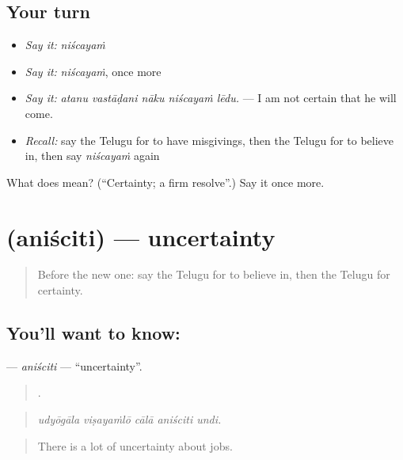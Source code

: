\subsection*{Your turn}
\begin{itemize}
\raggedright
  \item \emph{Say it:} \emph{niścayaṁ}
  \item \emph{Say it:} \emph{niścayaṁ}, once more
  \item \emph{Say it:} \emph{atanu vastāḍani nāku niścayaṁ lēdu.} — I am not certain that he will come.
  \item \emph{Recall:} say the Telugu for to have misgivings, then the Telugu for to believe in, then say \emph{niścayaṁ} again
\end{itemize}

\begin{tcolorbox}[breakable,colback=teal!4,colframe=teal!35!black,title={Before you move on}]
What does  mean? (\textquotedblleft{}Certainty; a firm resolve\textquotedblright{}.) Say it once more.
\end{tcolorbox}
\section[\texorpdfstring{\te{అనిశ్చితి} (aniściti)}{అనిశ్చితి (aniściti)}]{ (aniściti) — uncertainty}

\label{lesson:TE-C388-anisciti}



\begin{quote}
Before the new one: say the Telugu for to believe in, then the Telugu for certainty.
\end{quote}

\subsection*{You'll want to know: }
\textbf{} — \emph{aniściti} — \textquotedblleft{}uncertainty\textquotedblright{}.

\begin{quote}
    .
\end{quote}

\begin{quote}
\emph{udyōgāla viṣayaṁlō cālā aniściti undi.}
\end{quote}

\begin{quote}
There is a lot of uncertainty about jobs.
\end{quote}

